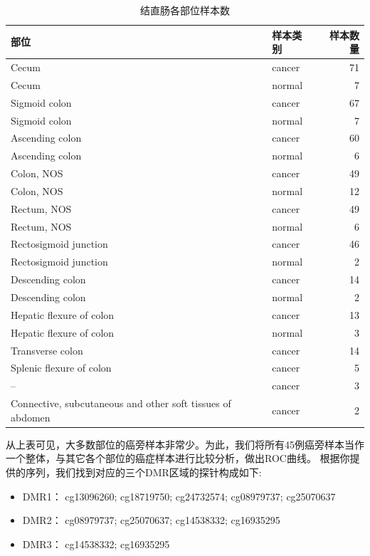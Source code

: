 \documentclass[openany]{book}
\providecommand{\tightlist}{%
  \setlength{\itemsep}{0pt}\setlength{\parskip}{0pt}}
\begin{document}
\begin{table}[!h]

\caption{\label{tab:example}结直肠各部位样本数}
\centering
\begin{tabular}{llr}
\toprule
部位 & 样本类别 & 样本数量\\
\midrule
\rowcolor{gray!6}  Cecum & cancer & 71\\
Cecum & normal & 7\\
\rowcolor{gray!6}  Sigmoid colon & cancer & 67\\
Sigmoid colon & normal & 7\\
\rowcolor{gray!6}  Ascending colon & cancer & 60\\
\addlinespace
Ascending colon & normal & 6\\
\rowcolor{gray!6}  Colon, NOS & cancer & 49\\
Colon, NOS & normal & 12\\
\rowcolor{gray!6}  Rectum, NOS & cancer & 49\\
Rectum, NOS & normal & 6\\
\addlinespace
\rowcolor{gray!6}  Rectosigmoid junction & cancer & 46\\
Rectosigmoid junction & normal & 2\\
\rowcolor{gray!6}  Descending colon & cancer & 14\\
Descending colon & normal & 2\\
\rowcolor{gray!6}  Hepatic flexure of colon & cancer & 13\\
\addlinespace
Hepatic flexure of colon & normal & 3\\
\rowcolor{gray!6}  Transverse colon & cancer & 14\\
Splenic flexure of colon & cancer & 5\\
\rowcolor{gray!6}  -- & cancer & 3\\
Connective, subcutaneous and other soft tissues of abdomen & cancer & 2\\
\bottomrule
\end{tabular}
\end{table}

从上表可见，大多数部位的癌旁样本非常少。为此，我们将所有45例癌旁样本当作一个整体，与其它各个部位的癌症样本进行比较分析，做出ROC曲线。
根据你提供的序列，我们找到对应的三个DMR区域的探针构成如下:

\begin{itemize}
\tightlist
\item
  DMR1： cg13096260; cg18719750; cg24732574; cg08979737; cg25070637
\item
  DMR2： cg08979737; cg25070637; cg14538332; cg16935295
\item
  DMR3： cg14538332; cg16935295
\end{itemize}
\end{document}
